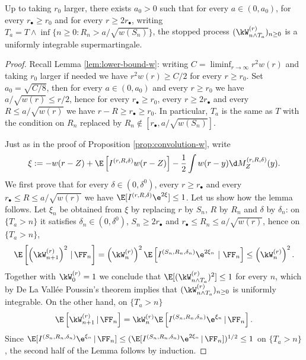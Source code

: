 \documentclass[10pt,a4paper]{article}
\begin{document}
\begin{lemma}\label{lem:discount-UI}
Up to taking $r_0$ larger, there exists $a_0>0$ such that for every $a \in (0,a_0)$, for every $r_\bullet \geq r_0$ and for every $r\geq 2r_\bullet$, writing $T_a = T \wedge \inf \{ n\geq 0 : R_n > a/\sqrt{w(S_n)} \}$, the stopped process $(\kW^{(r)}_{n\wedge T_a})_{n\geq 0}$ is a uniformly integrable supermartingale. %
\end{lemma}



\begin{proof}
Recall Lemma \ref{lem:lower-bound-w}: writing $C = \liminf_{r\to\infty} r^2 w(r)$ and taking $r_0$ larger if needed we have $r^2 w(r) \geq C/2$ for every $r\geq r_0$. Set $a_0 = \sqrt{C/8}$, then for every $a\in(0,a_0)$ and every $r\geq r_0$ we have $a/\sqrt{w(r)} \leq r/2$, hence for every $r_\bullet \geq r_0$, every $r\geq 2r_\bullet$ and every $R \leq a/\sqrt{w(r)}$ we have $r-R \geq r_\bullet \geq r_0$. In particular, $T_a$ is the same as $T$ with the condition on $R_n$ replaced by $R_n \notin [r_\bullet, a/\sqrt{w(S_n)}]$. 

Just as in the proof of Proposition \ref{prop:convolution-w}, write 
\[ \xi := -w(r-Z) + \E\left[I^{(r,R,\delta)} w(r-Z)\right] - \frac{1}{2} \int w(r-y) \d M_Z^{(r,R,\delta)}(y). \]
We first prove that for every $\delta \in (0,\delta^0)$, every $r\geq r_\bullet$ and every $r_\bullet \leq R \leq a/\sqrt{w(r)}$ we have $\E[I^{(r,R,\delta)} \e^{2\xi}] \leq 1$. Let us show how the lemma follows. Let $\xi_n$ be obtained from $\xi$ by replacing $r$ by $S_n$, $R$ by $R_n$ and $\delta$ by $\delta_n$: on $\{T_a>n\}$ it satisfies $\delta_n \in (0,\delta^0)$, $S_n\geq 2r_\bullet$ and $r_\bullet \leq R_n \leq a/\sqrt{w(r)}$, hence on $\{ T_a > n \}$, 
\begin{equation*}
\E\left[ \left(\kW^{(r)}_{n+1}\right)^2 \, | \, \FF_n\right] 
= \left(\kW^{(r)}_n\right)^2 \E\left[I^{(S_n, R_n, \delta_n)} \e^{2\xi_n} \ | \ \FF_n\right] 
\leq \left(\kW^{(r)}_n\right)^2 .
\end{equation*}
Together with $\kW^{(r)}_0=1$ we conclude that $\E[ (\kW^{(r)}_{n \wedge T_a})^2 ] \leq 1$ for every $n$, which by De La Vallée Poussin's theorem implies that $(\kW^{(r)}_{n \wedge T_a})_{n\geq 0}$ is uniformly integrable. On the other hand, on $\{T_a>n\}$
\[ \E\left[\kW^{(r)}_{n+1} \, | \, \FF_n \right] = \kW^{(r)}_{n} \E\left[I^{(S_n, R_n, \delta_n)} \e^{\xi_n} \, | \, \FF_n \right] . \]
Since $\E[I^{(S_n,R_n,\delta_n)} \e^{\xi_n} \, | \, \FF_n ] \leq (\E[I^{(S_n,R_n,\delta_n)}\e^{2\xi_n} \, | \, \FF_n ])^{1/2}\leq 1$ on $\{T_a>n\}$, the second half of the Lemma follows by induction. 


\end{proof}
\end{document}
